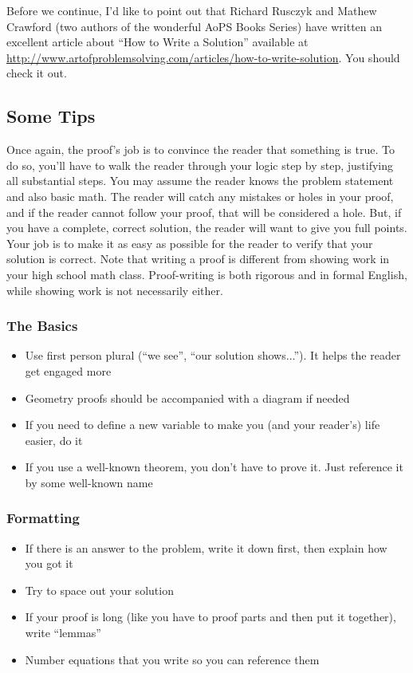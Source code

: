 Before we continue, I'd like to point out that Richard Rusczyk and Mathew Crawford (two authors of the wonderful AoPS Books Series) have written an excellent article about ``How to Write a Solution'' available at \url{http://www.artofproblemsolving.com/articles/how-to-write-solution}. You should check it out.

\subsection{Some Tips}
Once again, the proof's job is to convince the reader that something is true. To do so, you'll have to walk the reader through your logic step by step, justifying all substantial steps. You may assume the reader knows the problem statement and also basic math. The reader will catch any mistakes or holes in your proof, and if the reader cannot follow your proof, that will be considered a hole. But, if you have a complete, correct solution, the reader will want to give you full points. Your job is to make it as easy as possible for the reader to verify that your solution is correct.
Note that writing a proof is different from showing work in your high school math class. Proof-writing is both rigorous and in formal English, while showing work is not necessarily either.

\subsubsection{The Basics}
\begin{itemize}
    \item Use first person plural (``we see'', ``our solution shows...''). It helps the reader get engaged more
    \item Geometry proofs should be accompanied with a diagram if needed
    \item If you need to define a new variable to make you (and your reader's) life easier, do it
    \item If you use a well-known theorem, you don't have to prove it. Just reference it by some well-known name
\end{itemize}

\subsubsection{Formatting}
\begin{itemize}
    \item If there is an answer to the problem, write it down first, then explain how you got it
    \item Try to \quad space \quad out \quad your \quad solution
    \item If your proof is long (like you have to proof parts and then put it together), write ``lemmas''
    \item Number equations that you write so you can reference them
\end{itemize}

